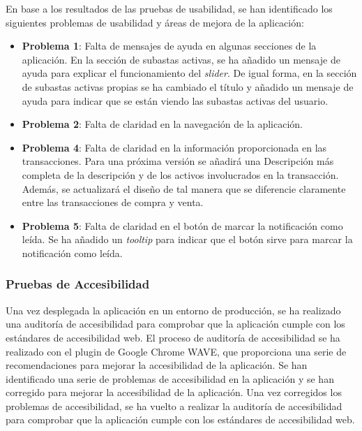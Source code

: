 En base a los resultados de las pruebas de usabilidad, se han identificado los siguientes problemas de usabilidad y áreas de mejora de la aplicación:
\begin{itemize}
    \item \textbf{Problema 1}: Falta de mensajes de ayuda en algunas secciones de la aplicación.
    En la sección de subastas activas, se ha añadido un mensaje de ayuda para explicar el funcionamiento del \textit{slider}.
    De igual forma, en la sección de subastas activas propias se ha cambiado el título y añadido un mensaje de ayuda para indicar que se están viendo las subastas activas del usuario.
    \item \textbf{Problema 2}: Falta de claridad en la navegación de la aplicación.
    \item \textbf{Problema 4}: Falta de claridad en la información proporcionada en las transacciones. Para una próxima versión se añadirá una Descripción
    más completa de la descripción y de los activos involucrados en la transacción. Además, se actualizará el diseño de tal manera que se diferencie
    claramente entre las transacciones de compra y venta.
    \item \textbf{Problema 5}: Falta de claridad en el botón de marcar la notificación como leída. 
    Se ha añadido un \textit{tooltip} para indicar que el botón sirve para marcar la notificación como leída.
\end{itemize}



\subsubsection{Pruebas de Accesibilidad}
Una vez desplegada la aplicación en un entorno de producción, se ha realizado una auditoría de accesibilidad para comprobar que la aplicación cumple con los estándares de accesibilidad web.
El proceso de auditoría de accesibilidad se ha realizado con el plugin de Google Chrome WAVE, que proporciona una serie de recomendaciones para mejorar la accesibilidad de la aplicación.
Se han identificado una serie de problemas de accesibilidad en la aplicación y se han corregido para mejorar la accesibilidad de la aplicación.
Una vez corregidos los problemas de accesibilidad, se ha vuelto a realizar la auditoría de accesibilidad para comprobar que la aplicación cumple con los estándares de accesibilidad web.

